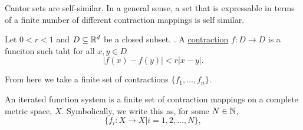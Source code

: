 





Cantor sets are self-similar.  In a general sense, a set that is expressable in terms of a finite number of different contraction mappings is self similar.  

\begin{definition}
    Let $0< r <1$ and $D \subseteq \mathbb{R}^d$ be a closed subset.  .  A \underline{contraction} $f: D \to D$ is a funciton such taht for all $x,y \in D$ $$\vert f(x) - f(y) \vert < r\vert x - y \vert.$$ 
\end{definition}

From here we take a finite set of contractions $\{f_1, \dots, f_n\}.$    

\begin{definition}
    An iterated function system is a finite set of contraction mappings on a complete metric space, $X$.  Symbolically, we write this as, for some $N \in \mathbb{N}$,
    $$\{f_i:X \to X \vert i = 1,2,\dots, N\}, $$
\end{definition}

